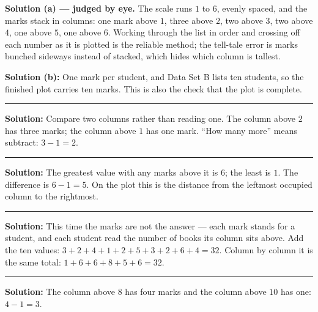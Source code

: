 \documentclass[12pt]{article}
\begin{document}
\textbf{Solution (a) --- judged by eye.} The scale runs $1$ to $6$, evenly spaced, and the marks stack
in columns: one mark above $1$, three above $2$, two above $3$, two above $4$, one above $5$, one
above $6$. Working through the list in order and crossing off each number as it is plotted is the
reliable method; the tell-tale error is marks bunched sideways instead of stacked, which hides which
column is tallest.

\textbf{Solution (b):} One mark per student, and Data Set B lists ten students, so the finished plot
carries ten marks. This is also the check that the plot is complete. 

\vspace{0.15cm}\noindent\rule{\linewidth}{0.2pt}


\textbf{Solution:} Compare two columns rather than reading one. The column above $2$ has three marks;
the column above $1$ has one mark. ``How many more'' means subtract: $3 - 1 = 2$. 

\vspace{0.15cm}\noindent\rule{\linewidth}{0.2pt}


\textbf{Solution:} The greatest value with any marks above it is $6$; the least is $1$. The difference
is $6 - 1 = 5$. On the plot this is the distance from the leftmost occupied column to the rightmost.

\vspace{0.15cm}\noindent\rule{\linewidth}{0.2pt}


\textbf{Solution:} This time the marks are not the answer --- each mark stands for a student, and each
student read the number of books its column sits above. Add the ten values:
$3 + 2 + 4 + 1 + 2 + 5 + 3 + 2 + 6 + 4 = 32$. Column by column it is the same total:
$1 + 6 + 6 + 8 + 5 + 6 = 32$. 

\vspace{0.15cm}\noindent\rule{\linewidth}{0.2pt}


\textbf{Solution:} The column above $8$ has four marks and the column above $10$ has one:
$4 - 1 = 3$. 
\end{document}
